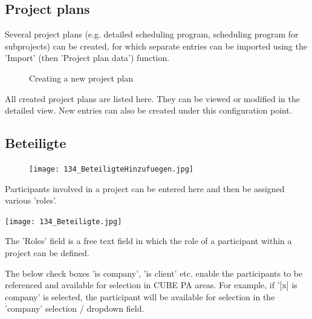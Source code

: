 \subsection{Project plans}

Several project plans (e.g. detailed scheduling program, scheduling program for subprojects) can be created, for which separate entries can be imported using the 'Import' (then 'Project plan data') function.

\begin{figure}[H]
\caption{Creating a new project plan}
\end{figure}

All created project plans are listed here. They can be viewed or modified in the detailed view. New entries can also be created under this configuration point.
\subsection{Beteiligte}

\begin{figure}
\vspace{-25pt}
\texttt{[image: 134\_BeteiligteHinzufuegen.jpg]}
\end{figure}

Participants involved in a project can be entered here and then be assigned various 'roles'.

\begin{center}
\hspace{-15pt}   
\texttt{[image: 134\_Beteiligte.jpg]}
\end{center}

The 'Roles' field is a free text field in which the role of a participant within a project can be defined.

\vspace{\baselineskip}

The below check boxes 'is company', 'is client' etc. enable the participants to be referenced and available for selection in CUBE PA areas. For example, if '[x] is company' is selected, the participant will be available for selection in the 'company' selection / dropdown field.

\vspace{\baselineskip}
\vspace{\baselineskip}
\vspace{\baselineskip}

